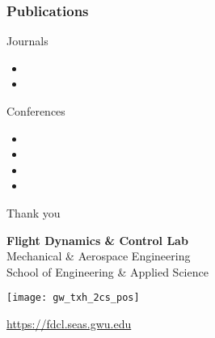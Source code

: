 \begin{frame}[t]\frametitle{Publications}

{\scriptsize
Journals
    \begin{itemize}
        \item {}
        \item {}
    \end{itemize}

Conferences

\begin{itemize}
    \item {}
    \item {}
    \item {}
    \item {}
\end{itemize}
}
\end{frame}

\begin{frame}[c]{Thank you}
  \centering
  
  \textbf{\large Flight Dynamics \& Control Lab} \\
  Mechanical \& Aerospace Engineering \\
  School of Engineering \& Applied Science
  
  \begin{center} %
        \texttt{[image: gw\_txh\_2cs\_pos]}
    \end{center}
  
  \url{https://fdcl.seas.gwu.edu}
\end{frame}